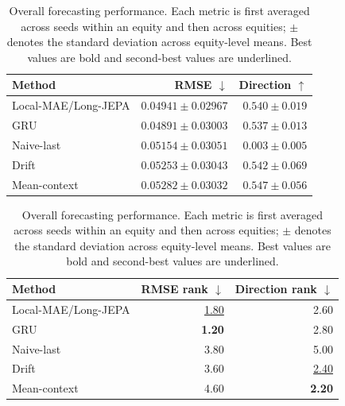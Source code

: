 \begin{table}[t]
\centering
\small
\caption{Overall forecasting performance. Each metric is first averaged across seeds within an equity and then across equities; $\pm$ denotes the standard deviation across equity-level means. Best values are bold and second-best values are underlined.}
\label{tab:main_metrics}
\begin{tabular}{lrr}
\toprule
Method & RMSE $\downarrow$ & Direction $\uparrow$ \\
\midrule
Local-MAE/Long-JEPA & \underline{$0.04941 \pm 0.02967$} & $0.540 \pm 0.019$ \\
GRU & \textbf{$0.04891 \pm 0.03003$} & $0.537 \pm 0.013$ \\
Naive-last & $0.05154 \pm 0.03051$ & $0.003 \pm 0.005$ \\
Drift & $0.05253 \pm 0.03043$ & \underline{$0.542 \pm 0.069$} \\
Mean-context & $0.05282 \pm 0.03032$ & \textbf{$0.547 \pm 0.056$} \\
\bottomrule
\end{tabular}
\par\medskip
\begin{tabular}{lrr}
\toprule
Method & RMSE rank $\downarrow$ & Direction rank $\downarrow$ \\
\midrule
Local-MAE/Long-JEPA & \underline{1.80} & 2.60 \\
GRU & \textbf{1.20} & 2.80 \\
Naive-last & 3.80 & 5.00 \\
Drift & 3.60 & \underline{2.40} \\
Mean-context & 4.60 & \textbf{2.20} \\
\bottomrule
\end{tabular}
\end{table}
